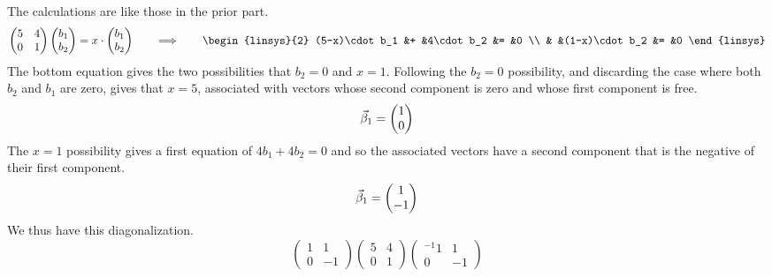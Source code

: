 \begin{exercises}
\begin{answer}
\begin{exparts}
      \partsitem The calculations are like those in the prior part.
          \begin{equation*}
            \begin{pmatrix}
               5  &4  \\
               0  &1
            \end{pmatrix}
            \colvec{b_1 \\ b_2}
            =x\cdot\colvec{b_1 \\ b_2}
            \qquad\Longrightarrow\qquad 
            \begin{linsys}{2}
               (5-x)\cdot b_1  &+  &4\cdot b_2     &=  &0  \\
                               &   &(1-x)\cdot b_2 &=  &0
            \end{linsys}
          \end{equation*}
          The bottom equation
          gives the two possibilities that $b_2=0$ and $x=1$.
          Following the $b_2=0$ possibility, and discarding the
          case where both $b_2$ and $b_1$ are zero, gives
          that $x=5$, associated with vectors whose second component
          is zero and whose first component is free.
          \begin{equation*}
            \vec{\beta}_1=\begin{pmatrix} 1 \\ 0 \end{pmatrix}
          \end{equation*}
          The $x=1$ possibility gives a first equation of
          $4b_1+4b_2=0$ and so the associated vectors have a 
          second component that is the negative of their first component.
          \begin{equation*}
            \vec{\beta}_1=\begin{pmatrix} 1 \\ -1 \end{pmatrix}
          \end{equation*}
          We thus have this diagonalization.
          \begin{equation*}
            \begin{pmatrix}
              1  &1  \\
              0  &-1
            \end{pmatrix}
            \begin{pmatrix}
               5  &4  \\
               0  &1
            \end{pmatrix}
            \begin{pmatrix}^{-1}
              1  &1  \\
              0  &-1
            \end{pmatrix}

\end{equation*}
\end{exparts}
\end{answer}
\end{exercises}
